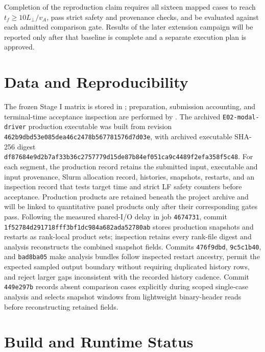 \documentclass[11pt]{article}
\begin{document}
Completion of the reproduction claim requires all sixteen mapped cases to
reach \(t_f\geq10L_\perp/v_A\), pass strict safety and provenance checks, and
be evaluated against each admitted comparison gate.  Results of the later
extension campaign will be reported only after that baseline is complete and
a separate execution plan is approved.

\section{Data and Reproducibility}

The frozen Stage I matrix is stored in
; preparation,
submission accounting, and terminal-time acceptance inspection are performed
by .  The archived
\texttt{E02-modal-driver} production executable was built from revision
\texttt{462b9dbd53e085dea46c2478b567781576d7d03e}, with archived executable
SHA-256 digest
\texttt{df87684e9d2b7af33b36c2757779d15de87b84ef051ca9c4489f2efa358f5c48}.
For each segment, the production record retains the submitted input,
executable and input provenance, Slurm allocation record, histories,
snapshots, restarts, and an inspection record that tests target time and
strict LF safety counters before acceptance.  Production products are
retained beneath the project
 archive and will be linked to quantitative panel
products only after their corresponding gates pass.  Following the measured
shared-I/O delay in job \texttt{4674731}, commit
\texttt{1f52784d291718fff3bf1dc984a682ada52780ab} stores production
snapshots and restarts as rank-local product sets; inspection retains every
rank-file digest and analysis reconstructs the combined snapshot fields.
Commits \texttt{476f9dbd}, \texttt{9c5c1b40}, and \texttt{bad8ba05}
make analysis bundles follow inspected restart ancestry, permit the expected
sampled output boundary without requiring duplicated history rows, and reject
larger gaps inconsistent with the recorded history cadence.
Commit \texttt{449e297b} records absent comparison cases explicitly during
scoped single-case analysis and selects snapshot windows from lightweight
binary-header reads before reconstructing retained fields.

\section{Build and Runtime Status}
\end{document}
